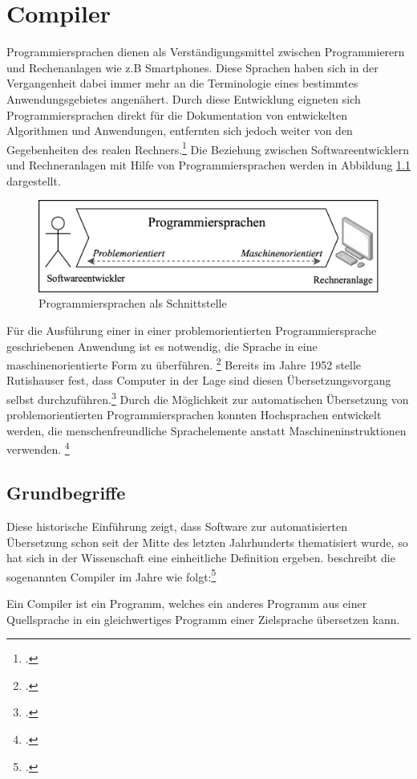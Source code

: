 \chapter{Compiler}
\label{chap:Compiler}

Programmiersprachen dienen als Verständigungsmittel zwischen Programmierern und Rechenanlagen wie z.B Smartphones.  Diese Sprachen haben sich in der Vergangenheit dabei immer mehr an die  Terminologie eines bestimmtes Anwendungsgebietes angenähert. Durch diese Entwicklung eigneten sich Programmiersprachen direkt für die Dokumentation von entwickelten Algorithmen und Anwendungen, entfernten sich jedoch weiter von den Gegebenheiten des realen Rechners.\footcite[Vgl.][S. 15]{Schneider1975} Die Beziehung zwischen Softwareentwicklern und Rechneranlagen mit Hilfe von Programmiersprachen werden in Abbildung \ref{fig:Programmiersprachen als Schnittstelle} dargestellt. 

\begin{figure}[!ht]
 \includegraphics[width=\textwidth,height=\textheight,keepaspectratio]{Images/LanguageIntermediary.png}
 \caption{Programmiersprachen als Schnittstelle}
 \label{fig:Programmiersprachen als Schnittstelle}
\end{figure}

Für die Ausführung einer in einer problemorientierten Programmiersprache geschriebenen Anwendung ist es notwendig, die Sprache in eine maschinenorientierte Form zu überführen. \footcite[Vgl.][S. 15]{Schneider1975} Bereits im Jahre 1952 stelle Rutishauser fest,  dass Computer in der Lage sind diesen Übersetzungsvorgang selbst durchzuführen.\footcite[Vgl.][S. 312]{Rutishauser1952} 
Durch die Möglichkeit zur automatischen Übersetzung von problemorientierten Programmiersprachen konnten Hochsprachen entwickelt werden, die menschenfreundliche Sprachelemente anstatt Maschineninstruktionen verwenden. \footcite[Vgl.][S. 47]{Wagenknecht2014}
\section{ Grundbegriffe}
Diese historische Einführung zeigt,  dass Software zur automatisierten Übersetzung schon seit der Mitte des letzten Jahrhunderts thematisiert wurde, so hat sich in der Wissenschaft eine einheitliche Definition ergeben.  \citeauthor{Ullmann2008} beschreibt die sogenannten Compiler im Jahre \citeyear{Ullmann2008} wie folgt:\footcite[Vgl.][S. 1]{Ullmann2008} 
\begin{Def}[Compiler]
Ein Compiler ist ein Programm, welches ein anderes Programm aus einer Quellsprache in ein gleichwertiges Programm einer Zielsprache übersetzen kann.
\end{Def} 
\vspace{-1em}

